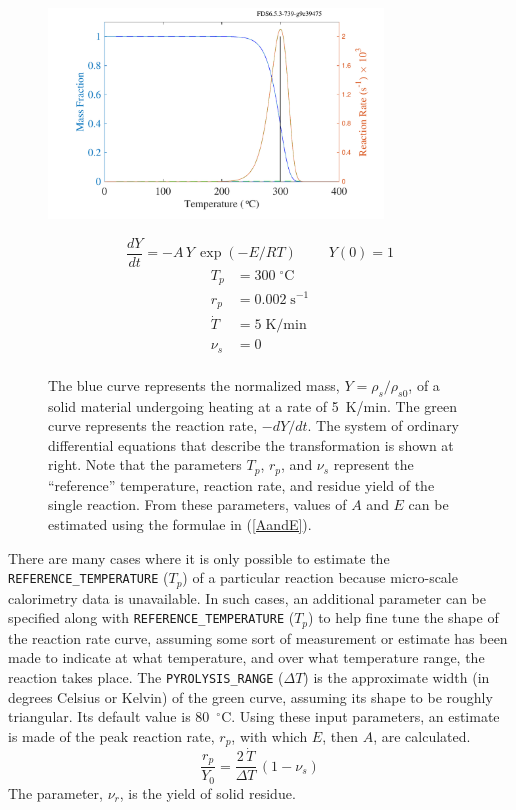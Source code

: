 \documentclass[11pt]{book}
\newcommand{\ct}{\tt\small}
\newcommand{\be}{\begin{equation}}
\newcommand{\ee}{\end{equation}}
\begin{document}
\begin{figure}[ht]
\noindent
\begin{minipage}{3.5in}
\includegraphics[width=3.5in]{SCRIPT_FIGURES/pyrolysis_1}
\end{minipage}
\hfill
\begin{minipage}{3.0in}
\begin{equation*}
   \frac{dY}{dt} = -A \, Y \, \exp(-E/RT)   \quad \; \quad    Y(0) =1
\end{equation*}
\begin{align*}
   T_p &= 300 \; ^\circ\mathrm{C}  \\
   r_p &= 0.002   \; \mathrm{s}^{-1}  \\
   \dot{T} &= 5 \; \mathrm{K/min} \\
   \nu_s &= 0 \\
\end{align*}
\end{minipage}
\caption[Simple demonstration of pyrolysis model.]{The blue curve represents the normalized mass, $Y=\rho_s/\rho_{s0}$, of a solid material
undergoing heating at a rate of 5~K/min. The green curve represents the reaction rate, $-dY/dt$. The system of ordinary differential equations that
describe the transformation is shown at right. Note that the parameters $T_p$, $r_p$, and $\nu_s$ represent the ``reference'' temperature,
reaction rate, and residue yield of the single reaction. From these parameters, values of $A$ and $E$ can be estimated using
the formulae in (\ref{AandE}).}
\label{pyrolysis}
\end{figure} \normalsize

There are many cases where it is only possible to estimate the {\ct REFERENCE\_TEMPERATURE} ($T_p$) of a particular
reaction because micro-scale calorimetry data is unavailable. In such cases,
an additional parameter can be specified along with {\ct REFERENCE\_TEMPERATURE} ($T_p$) to help fine tune the shape of the
reaction rate curve, assuming some sort of measurement or estimate has been made to indicate at what temperature, and over what
temperature range, the
reaction takes place. The {\ct PYROLYSIS\_RANGE} ($\Delta T$) is the
approximate width (in degrees Celsius or Kelvin) of the green curve, assuming its shape to be roughly triangular. Its default value is
80~$^\circ$C. Using these input parameters, an estimate is made of the peak reaction rate, $r_p$, with which $E$, then $A$,
are calculated.
\be
   \frac{r_p}{Y_0} = \frac{2 \, \dot{T}} {\Delta T} \, (1-\nu_s) \label{r_p}
\ee
The parameter, $\nu_r$, is the yield of solid residue.
\end{document}
